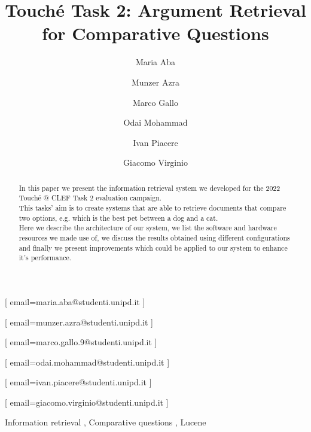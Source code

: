 \documentclass{ceurart}
\begin{document}


\title{Touché Task 2: Argument Retrieval for Comparative Questions}

\author[1]{Maria Aba}[%
email=maria.aba@studenti.unipd.it
]

\author[1]{Munzer Azra}[%
email=munzer.azra@studenti.unipd.it
]

\author[1]{Marco Gallo}[%
email=marco.gallo.9@studenti.unipd.it
]

\author[1]{Odai Mohammad}[%
email=odai.mohammad@studenti.unipd.it
]

\author[1]{Ivan Piacere}[%
email=ivan.piacere@studenti.unipd.it
]

\author[1]{Giacomo Virginio}[%
email=giacomo.virginio@studenti.unipd.it
]

\address[1]{University of Padua, Italy}


\begin{abstract}
	In this paper we present the information retrieval system we developed for the 2022 Touché @ CLEF Task 2 evaluation campaign.\\
	This tasks' aim is to create systems that are able to retrieve documents that compare two options, e.g. which is the best pet between a dog and a cat.\\
	Here we describe the architecture of our system, we list the software and hardware resources we made use of, we discuss the results obtained using different configurations and finally we present improvements which could be applied to our system to enhance it's performance.
\end{abstract}

\begin{keywords}
  Information retrieval \sep
  Comparative questions \sep
  Lucene
\end{keywords}
\end{document}
